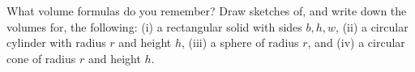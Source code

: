 What volume formulas do you remember?  Draw sketches of, and write down the volumes for, the following: (i) a rectangular solid with sides $b,h,w$, (ii) a circular cylinder with radius $r$ and height $h$, (iii) a sphere of radius $r$, and (iv) a circular cone of radius $r$ and height $h$.
